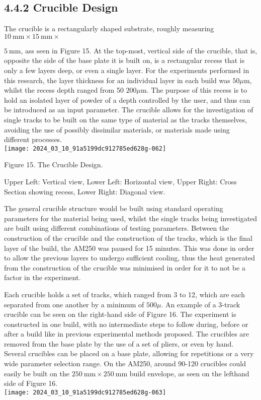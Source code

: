 \documentclass[10pt]{article}
\begin{document}
\subsection*{4.4.2 Crucible Design}
The crucible is a rectangularly shaped substrate, roughly measuring $10 \mathrm{~mm} \times 15 \mathrm{~mm} \times$

$5 \mathrm{~mm}$, ass seen in Figure 15. At the top-most, vertical side of the crucible, that is, opposite the side of the base plate it is built on, is a rectangular recess that is only a few layers deep, or even a single layer. For the experiments performed in this research, the layer thickness for an individual layer in each build was $50 \mu \mathrm{m}$, whilst the recess depth ranged from 50 $200 \mu \mathrm{m}$. The purpose of this recess is to hold an isolated layer of powder of a depth controlled by the user, and thus can be introduced as an input parameter. The crucible allows for the investigation of single tracks to be built on the same type of material as the tracks themselves, avoiding the use of possibly dissimilar materials, or materials made using different processes.\\
\texttt{[image: 2024\_03\_10\_91a5199dc912785ed628g-062]}

Figure 15. The Crucible Design.

Upper Left: Vertical view, Lower Left: Horizontal view, Upper Right: Cross Section showing recess, Lower Right: Diagonal view.

The general crucible structure would be built using standard operating parameters for the material being used, whilst the single tracks being investigated are built using different combinations of testing parameters. Between the construction of the crucible and the construction of the tracks, which is the final layer of the build, the AM250 was paused for 15 minutes. This was done in order to allow the previous layers to undergo sufficient cooling, thus the heat generated from the construction of the crucible was minimised in order for it to not be a factor in the experiment.

Each crucible holds a set of tracks, which ranged from 3 to 12, which are each separated from one another by a minimum of $500 \mu$. An example of a 3-track crucible can be seen on the right-hand side of Figure 16. The experiment is constructed in one build, with no intermediate steps to follow during, before or after a build like in previous experimental methods proposed. The crucibles are removed from the base plate by the use of a set of pliers, or even by hand. Several crucibles can be placed on a base plate, allowing for repetitions or a very wide parameter selection range. On the AM250, around 90-120 crucibles could easily be built on the $250 \mathrm{~mm} \times 250 \mathrm{~mm}$ build envelope, as seen on the lefthand side of Figure 16.\\
\texttt{[image: 2024\_03\_10\_91a5199dc912785ed628g-063]}
\end{document}
